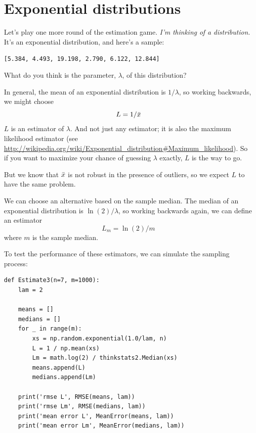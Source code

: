 \documentclass[12pt]{book}
\begin{document}
\section{Exponential distributions}

Let's play one more round of the estimation game.
{\em I'm thinking of a distribution.}  It's an exponential distribution, and 
here's a sample:

{\tt [5.384, 4.493, 19.198, 2.790, 6.122, 12.844]}

What do you think is the parameter, $\lambda$, of this distribution?

\newcommand{\lamhat}{L}
\newcommand{\lamhatmed}{L_m}

In general, the mean of an exponential distribution is $1/\lambda$,
so working backwards, we might choose
%
\[ \lamhat = 1 / \xbar\]
%
$\lamhat$ is an
estimator of $\lambda$.  And not just any estimator; it is also the
maximum likelihood estimator (see
\url{http://wikipedia.org/wiki/Exponential_distribution#Maximum_likelihood}).
So if you want to maximize your chance of guessing $\lambda$ exactly,
$\lamhat$ is the way to go.

But we know that $\bar{x}$ is not robust in the presence of outliers, so
we expect $\lamhat$ to have the same problem.

We can choose an alternative based on the sample median.
The median of an exponential distribution is $\ln(2) / \lambda$,
so working backwards again, we can define an estimator
%
\[ \lamhatmed = \ln(2) / m \]
%
where $m$ is the sample median.

To test the performance of these estimators, we can simulate the
sampling process:

\begin{verbatim}
def Estimate3(n=7, m=1000):
    lam = 2

    means = []
    medians = []
    for _ in range(m):
        xs = np.random.exponential(1.0/lam, n)
        L = 1 / np.mean(xs)
        Lm = math.log(2) / thinkstats2.Median(xs)
        means.append(L)
        medians.append(Lm)

    print('rmse L', RMSE(means, lam))
    print('rmse Lm', RMSE(medians, lam))
    print('mean error L', MeanError(means, lam))
    print('mean error Lm', MeanError(medians, lam))
\end{verbatim}
\end{document}
